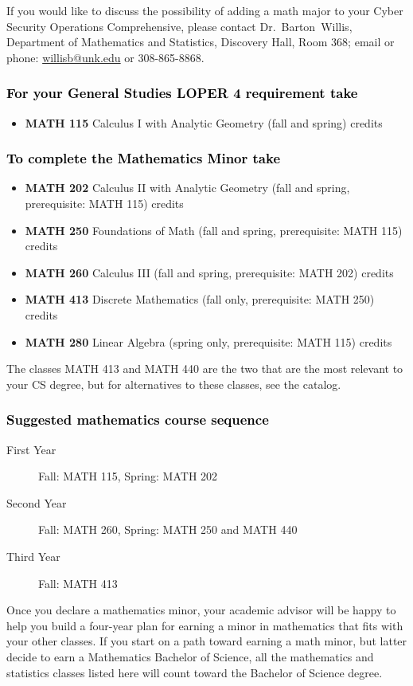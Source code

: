 \documentclass[10pt]{article}
\makeatletter
\newenvironment{mypar}[2]
   {\begin{list}{}%
     {\setlength\leftmargin{#1}
     \setlength\rightmargin{#2}}
     \item[]}
   {\end{list}}
\newcommand{\calcone}{\textbf{MATH 115} Calculus I with Analytic Geometry (fall and spring) \dotfill 5 credits}
\newcommand{\calctwo}{\textbf{MATH 202} Calculus II with Analytic Geometry (fall and spring, prerequisite: MATH 115) \dotfill 5 credits }
\newcommand{\foundations}{\textbf{MATH 250} Foundations of Math (fall and spring, prerequisite: MATH 115)  \dotfill 3 credits}
\newcommand{\calcthree}{\textbf{MATH 260} Calculus III  (fall and spring, prerequisite: MATH 202) \dotfill 5 credits}
\newcommand{\linear}{\textbf{MATH 280} Linear Algebra (spring only, prerequisite: MATH 115) \dotfill 3 credits}
\newcommand{\discrete}{\textbf{MATH 413} Discrete Mathematics  (fall only, prerequisite: MATH 250)\dotfill 3 credits}
\newcommand{\contactbw}{\mbox{Dr.\ Barton Willis}, Department of Mathematics and Statistics,  Discovery Hall, Room 368;
email or phone: \href{mailto:willisb@unk.edu}{willisb@unk.edu} or 308-865-8868.}
\newcommand{\forinfo}[2]{If you would like to discuss the possibility of adding a math {#1} to your {#2}, please contact \contactbw}
\makeatother
\begin{document}
 
 \forinfo{major}{Cyber Security Operations Comprehensive}


\vspace{-0.1in}

\subsubsection*{\textcolor{black}{For  your General Studies LOPER 4 requirement take}}
\begin{itemize}
\item  \calcone
\end{itemize}

\subsubsection*{\textcolor{black}{To complete the Mathematics Minor take}}

\begin{itemize}
\item \calctwo
\item \foundations
\item \calcthree
\item \discrete
\item \linear
\end{itemize}
\begin{mypar}{0.5cm}{0.5cm}{The classes MATH 413 and MATH 440 are the two that are the most relevant to your  CS degree, but for alternatives to these classes, see the catalog.} \end{mypar}

\vspace{-0.1in}
\subsubsection*{\textcolor{black}{Suggested mathematics course sequence}}

\begin{description}
   \item[\phantom{xxx} First Year] Fall: MATH 115, Spring:  MATH 202
      \item[\phantom{xxx} Second Year]  Fall: MATH 260,  Spring: MATH 250  and MATH 440
     \item[\phantom{xxx} Third Year]  Fall: MATH 413
 \end{description}
 
 \vspace{0.1in}
\noindent Once you declare a mathematics minor, your academic advisor will be happy to help you build a four-year plan for earning a minor in mathematics that fits with your other classes.  If you start on a path toward earning a math minor, but latter decide to earn a  Mathematics Bachelor of Science, all the mathematics and statistics  classes listed here will count toward the Bachelor of Science degree.
\end{document}
